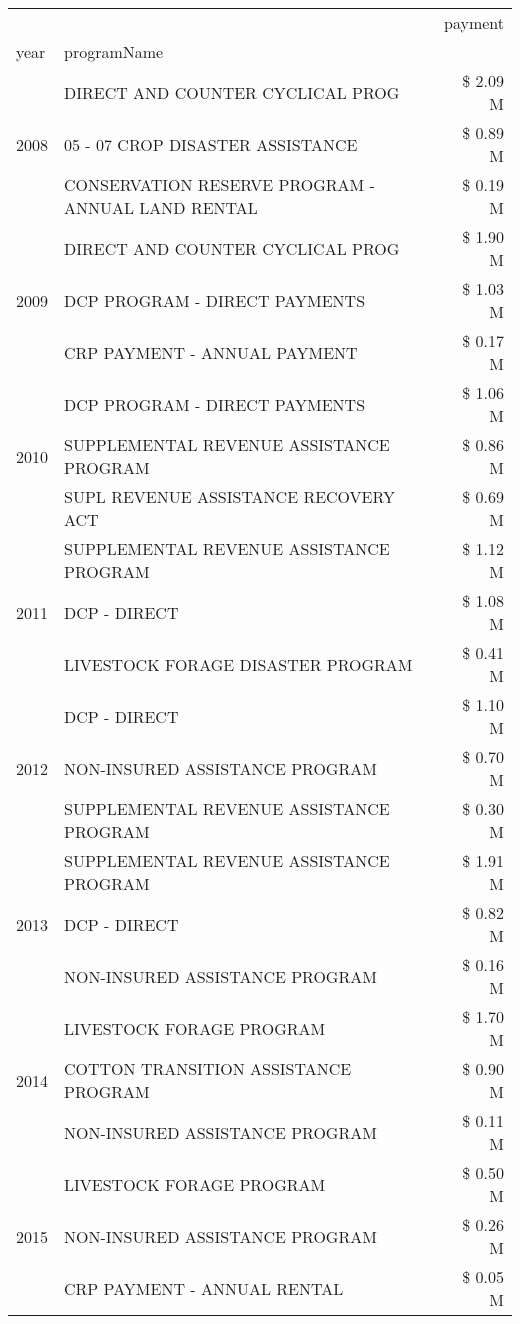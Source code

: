 \begin{tabular}{llr}
\toprule
 &  & payment \\
year & programName &  \\
\midrule
\multirow[t]{3}{*}{2008} & DIRECT AND COUNTER CYCLICAL PROG & \$ 2.09 M \\
 & 05 - 07 CROP DISASTER ASSISTANCE & \$ 0.89 M \\
 & CONSERVATION RESERVE PROGRAM - ANNUAL LAND RENTAL & \$ 0.19 M \\
\cline{1-3}
\multirow[t]{3}{*}{2009} & DIRECT AND COUNTER CYCLICAL PROG & \$ 1.90 M \\
 & DCP PROGRAM - DIRECT PAYMENTS & \$ 1.03 M \\
 & CRP PAYMENT - ANNUAL PAYMENT & \$ 0.17 M \\
\cline{1-3}
\multirow[t]{3}{*}{2010} & DCP PROGRAM - DIRECT PAYMENTS & \$ 1.06 M \\
 & SUPPLEMENTAL REVENUE ASSISTANCE PROGRAM & \$ 0.86 M \\
 & SUPL REVENUE ASSISTANCE RECOVERY ACT & \$ 0.69 M \\
\cline{1-3}
\multirow[t]{3}{*}{2011} & SUPPLEMENTAL REVENUE ASSISTANCE PROGRAM & \$ 1.12 M \\
 & DCP - DIRECT & \$ 1.08 M \\
 & LIVESTOCK FORAGE DISASTER PROGRAM & \$ 0.41 M \\
\cline{1-3}
\multirow[t]{3}{*}{2012} & DCP - DIRECT & \$ 1.10 M \\
 & NON-INSURED ASSISTANCE PROGRAM & \$ 0.70 M \\
 & SUPPLEMENTAL REVENUE ASSISTANCE PROGRAM & \$ 0.30 M \\
\cline{1-3}
\multirow[t]{3}{*}{2013} & SUPPLEMENTAL REVENUE ASSISTANCE PROGRAM & \$ 1.91 M \\
 & DCP - DIRECT & \$ 0.82 M \\
 & NON-INSURED ASSISTANCE PROGRAM & \$ 0.16 M \\
\cline{1-3}
\multirow[t]{3}{*}{2014} & LIVESTOCK FORAGE PROGRAM & \$ 1.70 M \\
 & COTTON TRANSITION ASSISTANCE PROGRAM & \$ 0.90 M \\
 & NON-INSURED ASSISTANCE PROGRAM & \$ 0.11 M \\
\cline{1-3}
\multirow[t]{3}{*}{2015} & LIVESTOCK FORAGE PROGRAM & \$ 0.50 M \\
 & NON-INSURED ASSISTANCE PROGRAM & \$ 0.26 M \\
 & CRP PAYMENT - ANNUAL RENTAL & \$ 0.05 M \\

\end{tabular}
